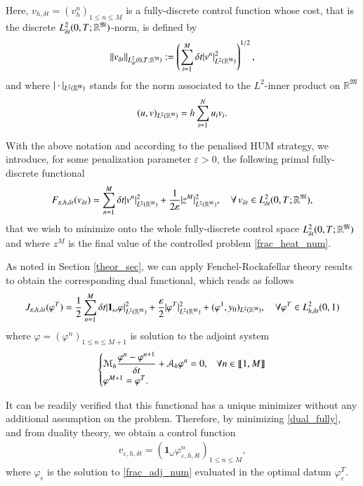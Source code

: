 Here, $v_{h,\delta t}=(v_h^n)_{1\leq n\leq M}$ is a fully-discrete control function whose cost, that is the discrete $L_{\delta t}^2(0,T;\mathbb R^{\mathfrak{M}})$-norm, is defined by
%
\begin{align*}
\|v_{\delta t}\|_{L_{\delta t}^2(0,T;\mathbb R^{\mathfrak{M}})}:=\left(\sum_{i=1}^M\delta t |v^n|^2_{L^2(\mathbb{R}^{\mathfrak{M}})}\right)^{1/2},
\end{align*}
%
and where $| \cdot |_{L^2(\mathbb{R}^{\mathfrak{M}})}$ stands for the norm associated to the $L^2$-inner product on $\mathbb{R}^\mathfrak M$
%
\begin{align*}
(u,v)_{L^2(\mathbb{R}^{\mathfrak{M}})}=h \sum_{i=1}^N u_i v_i.
\end{align*}
%

With the above notation and according to the penalised HUM strategy, we introduce, for some penalization parameter $\varepsilon>0$, the following primal fully-discrete functional 
%
\begin{align*}
F_{\varepsilon,h,\delta t}(v_{\delta t})=\sum_{n=1}^{M}\delta t |v^n|^2_{L^2(\mathbb{R}^{\mathfrak{M}})}+\frac{1}{2\varepsilon}|z^M|^2_{L^2(\mathbb{R}^{\mathfrak{M}})}, \quad \forall \, v_{\delta t}\in L_{\delta t}^2(0,T;\mathbb R^{\mathfrak{M}}),
\end{align*}
%
that we wish to minimize onto the whole fully-discrete control space $L_{\delta t}^2(0,T;\mathbb R^{\mathfrak{M}})$ and where $z^M$ is the final value of the controlled problem \eqref{frac_heat_num}. 

As noted in Section \ref{theor_sec}, we can apply Fenchel-Rockafellar theory results to obtain the corresponding dual functional, which reads as follows
%
\begin{align}\label{dual_fully}
	J_{\varepsilon,h,\delta t}(\varphi^T)=\frac{1}{2}\sum_{n=1}^{M}\delta t|\mathbf 1_\omega\varphi|^2_{L^2(\mathbb{R}^{\mathfrak{M}})}+\frac{\varepsilon}{2}|\varphi^T|^2_{L^2(\mathbb{R}^{\mathfrak{M}})}+(\varphi^1,y_0)_{L^2(\mathbb{R}^{\mathfrak{M}})}, \quad \forall \varphi^T\in L_{h,\delta t}^2(0,1)
\end{align}
%
where $\varphi=(\varphi^n)_{1\leq n\leq M+1}$ is solution to the adjoint system
%
\begin{align}\label{frac_adj_num}
	\begin{cases}
		\displaystyle\mathcal M_h \frac{\varphi^n-\varphi^{n+1}}{\delta t}+\mathcal A_h \varphi^n=0, & \forall n\in\llbracket 1,M\rrbracket
		\\
		\varphi^{M+1}=\varphi^T. 
	\end{cases}
\end{align}

It can be readily verified that this functional has a unique minimizer without any additional assumption on the problem. Therefore, by minimizing  \eqref{dual_fully}, and from duality theory, we obtain a control function 
\begin{align*}
	v_{\varepsilon,h,\delta t}=\left(\mathbf{1}_\omega\varphi_{\varepsilon,h,\delta t}^n\right)_{1\leq n\leq M},
\end{align*}
where $\varphi_\epsilon$ is the solution to \eqref{frac_adj_num} evaluated in the optimal datum $\varphi_\varepsilon^T$. 

